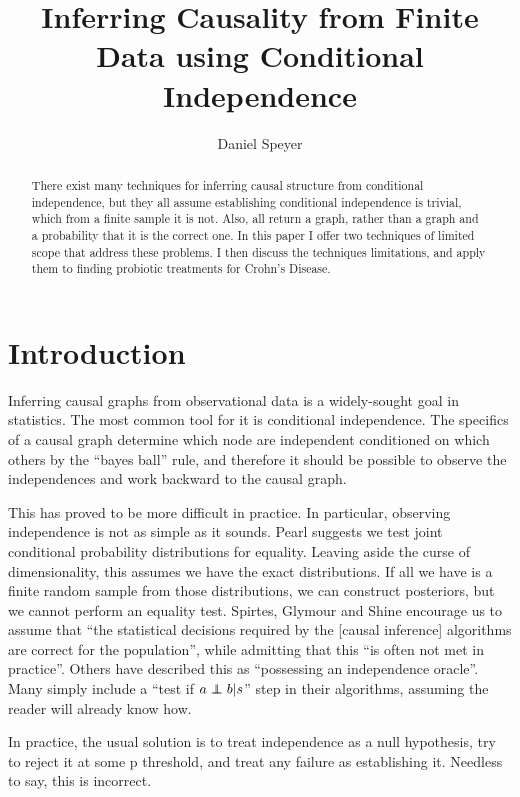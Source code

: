 \documentclass[twocolumn,12pt]{article}
\title{Inferring Causality from Finite Data using Conditional Independence}
\author{Daniel Speyer}
\newcommand\indep{\protect\mathpalette{\protect\independenT}{\perp}}
\def\independenT#1#2{\mathrel{\rlap{$#1#2$}\mkern2mu{#1#2}}}
\begin{document}
\maketitle

\begin{abstract}
  There exist many techniques for inferring causal structure from
  conditional independence, but they all assume establishing
  conditional independence is trivial, which from a finite sample it
  is not.  Also, all return a graph,
  rather than a graph and a probability that it is the correct one.
  In this paper I offer two techniques of limited scope that address
  these problems.  I then discuss the techniques limitations, and
  apply them to finding probiotic treatments for Crohn's Disease.
\end{abstract}

\section{Introduction}

Inferring causal graphs from observational data is a widely-sought
goal in statistics.  The most common tool for it is conditional
independence.  The specifics of a causal graph determine which node
are independent conditioned on which others by the ``bayes ball''
rule, and therefore it should be possible to observe the independences
and work backward to the causal graph.

This has proved to be more difficult in practice.  In particular,
observing independence is not as simple as it sounds.  Pearl suggests
we test joint conditional probability distributions for equality\cite{Pearl}.
Leaving aside the curse of dimensionality, this assumes we have the
exact distributions.  If all we have is a finite random sample from
those distributions, we can construct posteriors, but we cannot perform
an equality test.  Spirtes, Glymour and Shine  encourage us to assume that
``the statistical decisions required by the [causal inference]
algorithms are correct
for the population'', while admitting that this ``is often not met in
practice''\cite{Spirtes}.  Others have described this as ``possessing an
independence oracle''\cite{Peters,pcalg}.  Many simply include a ``test if $a\indep
b|s$'' step in their algorithms, assuming the reader will already know
how.

In practice, the usual solution is to treat independence as a null
hypothesis, try to reject it at some p threshold, and treat any
failure as establishing it.  Needless to say, this is incorrect.
\end{document}
